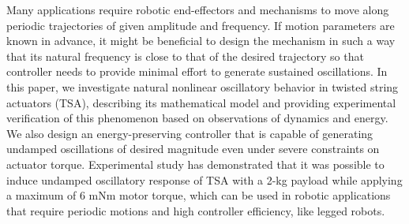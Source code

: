 Many applications require robotic end-effectors and mechanisms to move along periodic trajectories of given amplitude and frequency.
If motion parameters are known in advance, it might be beneficial to design the mechanism in such a way that its natural frequency is close to that of the desired trajectory so that controller needs to provide minimal effort to generate sustained oscillations. 
In this paper, we investigate natural nonlinear oscillatory behavior in twisted  string  actuators (TSA), describing its mathematical model and providing experimental verification of this phenomenon based on observations of dynamics and energy.
We also design an energy-preserving controller that is capable of generating undamped oscillations of desired magnitude even under severe constraints on actuator torque.
Experimental study has demonstrated that it was possible to induce undamped oscillatory response of TSA with a 2-kg payload while applying a maximum of 6 mNm motor torque, which can be used in robotic applications that require periodic motions and high controller efficiency, like legged robots.